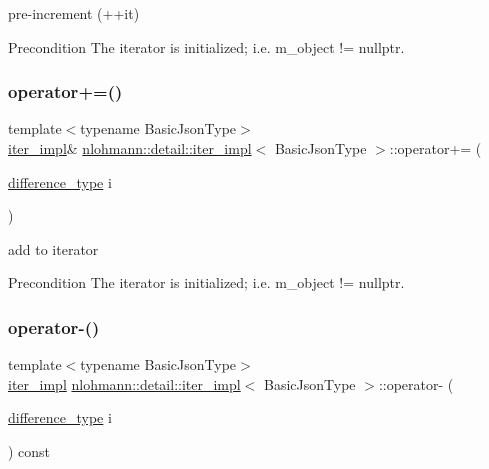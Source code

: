 pre-\/increment (++it) 

\begin{DoxyPrecond}{Precondition}
The iterator is initialized; i.\+e. {\ttfamily m\+\_\+object != nullptr}. 
\end{DoxyPrecond}
\mbox{\label{classnlohmann_1_1detail_1_1iter__impl_a3eef94f9d167046e7f773aeb6b78090c}} 
\subsubsection{\texorpdfstring{operator+=()}{operator+=()}}
{\footnotesize\ttfamily template$<$typename Basic\+Json\+Type$>$ \\
\mbox{\hyperlink{classnlohmann_1_1detail_1_1iter__impl}{iter\+\_\+impl}}\& \mbox{\hyperlink{classnlohmann_1_1detail_1_1iter__impl}{nlohmann\+::detail\+::iter\+\_\+impl}}$<$ Basic\+Json\+Type $>$\+::operator+= (\begin{DoxyParamCaption}\item[{\mbox{\hyperlink{classnlohmann_1_1detail_1_1iter__impl_a2f7ea9f7022850809c60fc3263775840}{difference\+\_\+type}}}]{i }\end{DoxyParamCaption})\hspace{0.3cm}{\ttfamily [inline]}}



add to iterator 

\begin{DoxyPrecond}{Precondition}
The iterator is initialized; i.\+e. {\ttfamily m\+\_\+object != nullptr}. 
\end{DoxyPrecond}
\mbox{\label{classnlohmann_1_1detail_1_1iter__impl_a0dd9c415b94a02ff2aa25da75e52da30}} 
\subsubsection{\texorpdfstring{operator-\/()}{operator-()}\hspace{0.1cm}{\footnotesize\ttfamily [1/2]}}
{\footnotesize\ttfamily template$<$typename Basic\+Json\+Type$>$ \\
\mbox{\hyperlink{classnlohmann_1_1detail_1_1iter__impl}{iter\+\_\+impl}} \mbox{\hyperlink{classnlohmann_1_1detail_1_1iter__impl}{nlohmann\+::detail\+::iter\+\_\+impl}}$<$ Basic\+Json\+Type $>$\+::operator-\/ (\begin{DoxyParamCaption}\item[{\mbox{\hyperlink{classnlohmann_1_1detail_1_1iter__impl_a2f7ea9f7022850809c60fc3263775840}{difference\+\_\+type}}}]{i }\end{DoxyParamCaption}) const\hspace{0.3cm}{\ttfamily [inline]}}



